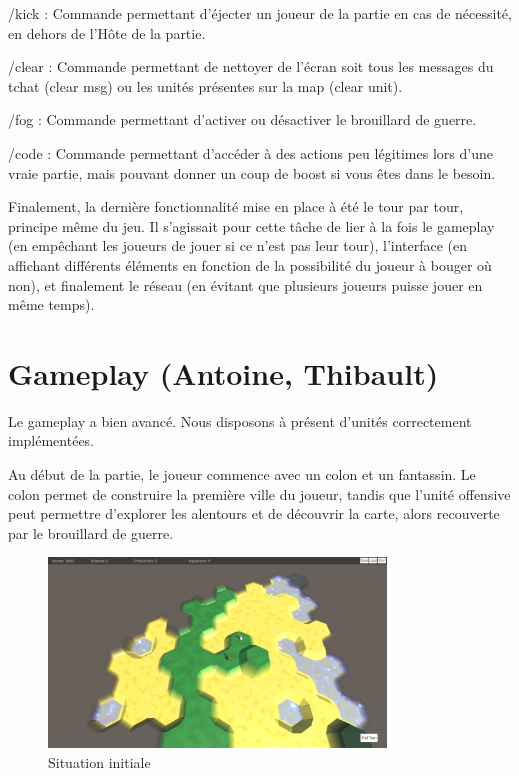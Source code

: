 \documentclass[12pt]{report}
\begin{document}
/kick : Commande permettant d’éjecter un joueur de la partie en cas de
nécessité, en dehors de l'Hôte de la partie.

/clear : Commande permettant de nettoyer de l’écran soit tous les messages du
tchat (clear msg) ou les unités présentes sur la map (clear unit).

/fog : Commande permettant d’activer ou désactiver le brouillard de guerre.

/code :  Commande permettant d'accéder à des actions peu légitimes lors d’une
vraie partie, mais pouvant donner un coup de boost si vous êtes dans le besoin.

Finalement, la dernière fonctionnalité mise en place à été le tour par tour,
principe même du jeu. Il s’agissait pour cette tâche de lier à la fois le
gameplay (en empêchant les joueurs de jouer si ce n’est pas leur tour),
l’interface (en affichant différents éléments en fonction de la possibilité du
joueur à bouger où non), et finalement le réseau (en évitant que plusieurs
joueurs puisse jouer en même temps).

\section{Gameplay (Antoine, Thibault)}

Le gameplay a bien avancé. Nous disposons à présent d’unités correctement
implémentées.

Au début de la partie, le joueur commence avec un colon et un fantassin. Le
colon permet de construire la première ville du joueur, tandis que l’unité
offensive peut permettre d’explorer les alentours et de découvrir la carte,
alors recouverte par le brouillard de guerre. 

\begin{figure}[H]
    \centering
    \includegraphics[width=0.8\textwidth]{InitialSituation}
    \caption{Situation initiale}
\end{figure}
\end{document}

